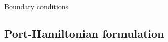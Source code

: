 \documentclass[aspectratio=169]{ISAE-Beamer}
\begin{document}
\begin{frame}{Boundary conditions}
\begin{overlayarea}{\textwidth}{\textheight}
\begin{tcolorbox}
\end{tcolorbox}
\end{overlayarea}
\end{frame}

\subsection{Port-Hamiltonian formulation}
\end{document}
